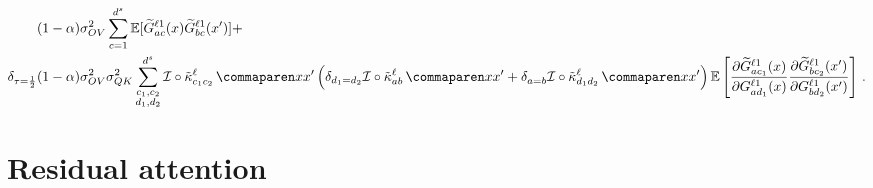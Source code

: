 \begin{align*}
    &
    (1 - \interpKernCoeff)
    \OVVar
    \sum_{c = 1}^{\spatialDimension}
        \E [
            \tildeLogit{\fIndexA c}{\depthSymbol 1} (\inputSymbol)
            \tildeLogit{\fIndexB c}{\depthSymbol 1} (\inputSymbol')
        ]
    +
    \\
    \delta_{\scaling = \frac{1}{2}}
    &(1 - \interpKernCoeff)
    \OVVar
    \QKVar
    \sum_{\substack{c_1, c_2 \\ d_1, d_2}}^{\spatialDimension}
        \interpKern \circ \kerntildef{c_1 c_2}{\depthSymbol}{\inputSymbol}{\inputSymbol'}
        \left( 
            \delta_{\substack{d_1 = d_2}}
            \interpKern \circ \kerntildef{\fIndexA \fIndexB}{\depthSymbol}{\inputSymbol}{\inputSymbol'}
            +
            \delta_{\substack{\fIndexA = \fIndexB}}
            \interpKern \circ \kerntildef{d_1 d_2}{\depthSymbol}{\inputSymbol}{\inputSymbol'}
        \right)
        \E \left[
            \frac{
                \partial
                \tildeLogit{\fIndexA c_1}{\depthSymbol 1} (\inputSymbol)
            }{
                \partial 
                \logitSymbol_{\fIndexA d_1}^{\depthSymbol 1} (\inputSymbol)
            }
            \frac{
                \partial
                \tildeLogit{\fIndexB c_2}{\depthSymbol 1} (\inputSymbol')
            }{
                \partial 
                \logitSymbol_{\fIndexB d_2}^{\depthSymbol 1} (\inputSymbol')
            }
        \right]
    \, .
\end{align*}
%




\section{Residual attention}\label{sect:residual_attention_appendix}

